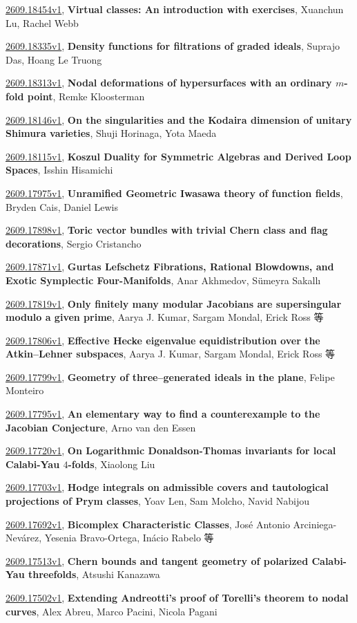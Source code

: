 \documentclass[9pt, a4paper]{article}
\theoremstyle{plain}
\theoremstyle{definition}
\theoremstyle{remark}
\newcommand{\arxiv}[3]{\href{https://arxiv.org/abs/#1}{#1}, \textbf{\textcolor{arxivblue}{#2}}, #3}
\begin{document}
\arxiv{2609.18454v1}{Virtual classes: An introduction with exercises}{Xuanchun Lu, Rachel Webb}

\arxiv{2609.18335v1}{Density functions for filtrations of graded ideals}{Suprajo Das, Hoang Le Truong}

\arxiv{2609.18313v1}{Nodal deformations of hypersurfaces with an ordinary $m$-fold point}{Remke Kloosterman}

\arxiv{2609.18146v1}{On the singularities and the Kodaira dimension of unitary Shimura varieties}{Shuji Horinaga, Yota Maeda}

\arxiv{2609.18115v1}{Koszul Duality for Symmetric Algebras and Derived Loop Spaces}{Isshin Hisamichi}

\arxiv{2609.17975v1}{Unramified Geometric Iwasawa theory of function fields}{Bryden Cais, Daniel Lewis}

\arxiv{2609.17898v1}{Toric vector bundles with trivial Chern class and flag decorations}{Sergio Cristancho}

\arxiv{2609.17871v1}{Gurtas Lefschetz Fibrations, Rational Blowdowns, and Exotic Symplectic Four-Manifolds}{Anar Akhmedov, Sümeyra Sakallı}

\arxiv{2609.17819v1}{Only finitely many modular Jacobians are supersingular modulo a given prime}{Aarya J. Kumar, Sargam Mondal, Erick Ross 等}

\arxiv{2609.17806v1}{Effective Hecke eigenvalue equidistribution over the Atkin--Lehner subspaces}{Aarya J. Kumar, Sargam Mondal, Erick Ross 等}

\arxiv{2609.17799v1}{Geometry of three--generated ideals in the plane}{Felipe Monteiro}

\arxiv{2609.17795v1}{An elementary way to find a counterexample to the Jacobian Conjecture}{Arno van den Essen}

\arxiv{2609.17720v1}{On Logarithmic Donaldson-Thomas invariants for local Calabi-Yau $4$-folds}{Xiaolong Liu}

\arxiv{2609.17703v1}{Hodge integrals on admissible covers and tautological projections of Prym classes}{Yoav Len, Sam Molcho, Navid Nabijou}

\arxiv{2609.17692v1}{Bicomplex Characteristic Classes}{José Antonio Arciniega-Nevárez, Yesenia Bravo-Ortega, Inácio Rabelo 等}

\arxiv{2609.17513v1}{Chern bounds and tangent geometry of polarized Calabi-Yau threefolds}{Atsushi Kanazawa}

\arxiv{2609.17502v1}{Extending Andreotti's proof of Torelli's theorem to nodal curves}{Alex Abreu, Marco Pacini, Nicola Pagani}
\end{document}

